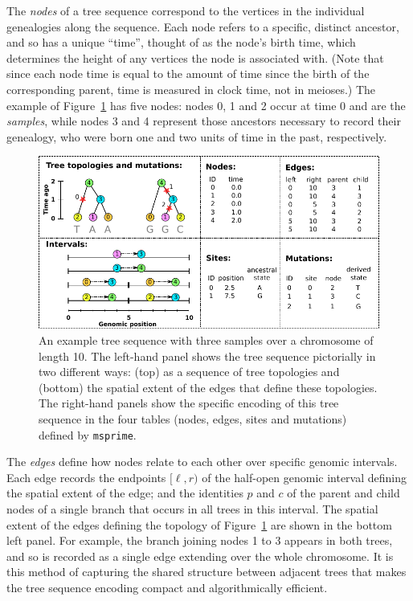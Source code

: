 \documentclass{article}
\newcommand{\msprime}{\texttt{msprime}}
\begin{document}
The \emph{nodes} of a tree sequence
correspond to the vertices in the individual genealogies along the sequence.
Each node refers to a specific, distinct ancestor,
and so has a unique ``time'',
thought of as the node's birth time, which determines the height of any vertices
the node is associated with.
(Note that since each node time is equal to the amount of time since the {birth} of the
corresponding parent, time is measured in clock time, not in meioses.)
The example of Figure~\ref{fig:example_tree_sequence} has five nodes:
nodes 0, 1 and 2 occur at time 0 and are the \emph{samples},
while nodes 3 and 4 represent those ancestors necessary to record their genealogy,
who were born one and two units of time in the past, respectively.

\begin{figure}
    \begin{center}
        \includegraphics[width=\textwidth]{example_tree_sequence}
    \end{center}
    \caption{
        An example tree sequence with three samples over a chromosome of length 10.
        The left-hand panel shows the tree sequence pictorially in two different ways:
        (top) as a sequence of tree topologies
        and (bottom) the spatial extent of the edges that define these topologies.
        The right-hand panels show the specific encoding
        of this tree sequence in the four tables (nodes, edges, sites and mutations)
        defined by \msprime.
        \label{fig:example_tree_sequence}
    }
\end{figure}

The \emph{edges} define how nodes relate to each other over specific genomic intervals.
Each edge records
the endpoints $[\ell, r)$ of the half-open genomic interval defining the
spatial extent of the edge;
and the identities $p$ and $c$ of the parent and child nodes
of a single branch that occurs in all trees in this interval.
The spatial extent of the edges defining the topology of Figure~\ref{fig:example_tree_sequence}
are shown in the bottom left panel.
For example, the branch joining nodes 1 to 3 appears in both trees,
and so is recorded as a single edge extending over the whole chromosome.
It is this method of capturing the shared structure between adjacent trees that makes the
tree sequence encoding compact and algorithmically efficient.
\end{document}
